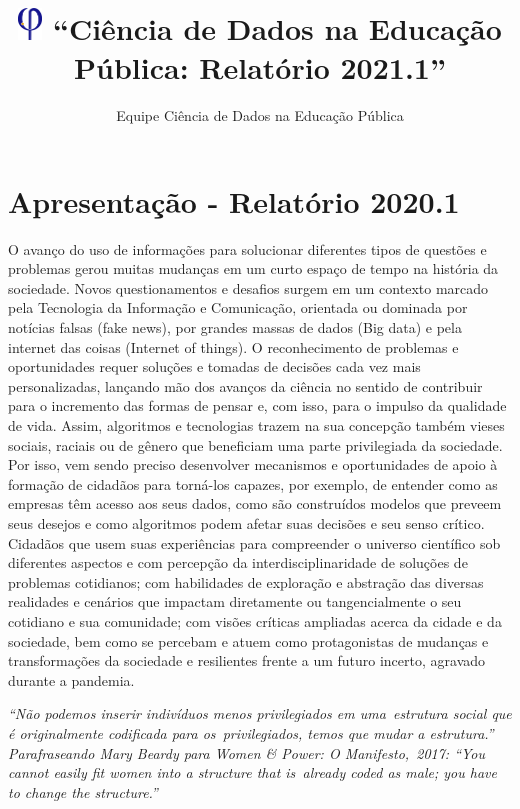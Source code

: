 \documentclass[
]{book}
\title{\includegraphics[width=0.25in,height=\textheight]{logo.png} ``Ciência de Dados na Educação Pública: Relatório 2021.1''}
\author{Equipe Ciência de Dados na Educação Pública}
\date{}
\begin{document}
\maketitle

{
\setcounter{tocdepth}{1}
\tableofcontents
}
\hypertarget{apresentauxe7uxe3o---relatuxf3rio-2020.1}{%
\chapter{Apresentação - Relatório 2020.1}\label{apresentauxe7uxe3o---relatuxf3rio-2020.1}}

O avanço do uso de informações para solucionar diferentes tipos de questões e problemas gerou muitas mudanças em um curto espaço de tempo na história da sociedade. Novos questionamentos e desafios surgem em um contexto marcado pela Tecnologia da Informação e Comunicação, orientada ou dominada por notícias falsas (fake news), por grandes massas de dados (Big data) e pela internet das coisas (Internet of things). O reconhecimento de problemas e oportunidades requer soluções e tomadas de decisões cada vez mais personalizadas, lançando mão dos avanços da ciência no sentido de contribuir para o incremento das formas de pensar e, com isso, para o impulso da qualidade de vida. Assim, algoritmos e tecnologias trazem na sua concepção também vieses sociais, raciais ou de gênero que beneficiam uma parte privilegiada da sociedade. Por isso, vem sendo preciso desenvolver mecanismos e oportunidades de apoio à formação de cidadãos para torná-los capazes, por exemplo, de entender como as empresas têm acesso aos seus dados, como são construídos modelos que preveem seus desejos e como algoritmos podem afetar suas decisões e seu senso crítico. Cidadãos que usem suas experiências para compreender o universo científico sob diferentes aspectos e com percepção da interdisciplinaridade de soluções de problemas cotidianos; com habilidades de exploração e abstração das diversas realidades e cenários que impactam diretamente ou tangencialmente o seu cotidiano e sua comunidade; com visões críticas ampliadas acerca da cidade e da sociedade, bem como se percebam e atuem como protagonistas de mudanças e transformações da sociedade e resilientes frente a um futuro incerto, agravado durante a pandemia.

\emph{``Não podemos inserir indivíduos menos privilegiados em uma~estrutura social que é originalmente codificada para os~privilegiados, temos que mudar a estrutura.''\\
Parafraseando Mary Beardy para Women \& Power: O Manifesto,~2017: ``You cannot easily fit women into a structure that is~already coded as male; you have to change the structure.''}
\end{document}
